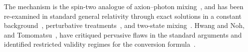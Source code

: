 The mechanism is the spin-two analogue of axion--photon
mixing~\cite{raffelt1988mixing}, and has been re-examined in
standard general relativity through exact solutions in a
constant background~\cite{ejlli2020graviton}, perturbative
treatments~\cite{Ejlli:2018hke}, and two-state mixing~\cite{palessandro2023simple, palessandro2024gertsenshtein}.
Hwang and Noh, and Tomomatsu~\etal, have critiqued pervasive flaws
in the standard arguments and identified restricted validity regimes
for the conversion
formula~\cite{hwangnoh2023emdef, hwangnoh2023graviton, hwangnoh2024nonlinear, tomomatsu2025gertsenshtein}.

